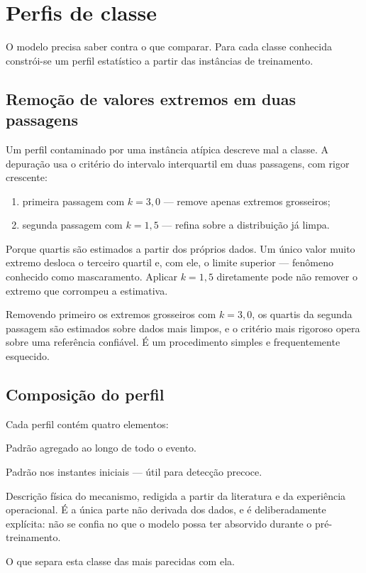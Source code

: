 \section{Perfis de classe}

O modelo precisa saber contra o que comparar. Para cada classe conhecida constrói-se um
perfil estatístico a partir das instâncias de treinamento.

\subsection{Remoção de valores extremos em duas passagens}

Um perfil contaminado por uma instância atípica descreve mal a classe. A depuração usa o
critério do intervalo interquartil em duas passagens, com rigor crescente:

\begin{enumerate}[leftmargin=*,itemsep=0.2em]
  \item primeira passagem com $k = 3{,}0$ --- remove apenas extremos grosseiros;
  \item segunda passagem com $k = 1{,}5$ --- refina sobre a distribuição já limpa.
\end{enumerate}

\begin{destaque}[Por que duas passagens e não uma com $k = 1{,}5$]
Porque quartis são estimados a partir dos próprios dados. Um único valor muito extremo
desloca o terceiro quartil e, com ele, o limite superior --- fenômeno conhecido como
mascaramento. Aplicar $k = 1{,}5$ diretamente pode não remover o extremo que corrompeu a
estimativa.

Removendo primeiro os extremos grosseiros com $k = 3{,}0$, os quartis da segunda
passagem são estimados sobre dados mais limpos, e o critério mais rigoroso opera sobre
uma referência confiável. É um procedimento simples e frequentemente esquecido.
\end{destaque}

\subsection{Composição do perfil}

Cada perfil contém quatro elementos:

\begin{description}[leftmargin=0pt,style=nextline,itemsep=0.4em]
\item[Comportamento macro.] Padrão agregado ao longo de todo o evento.
\item[Comportamento local.] Padrão nos instantes iniciais --- útil para detecção precoce.
\item[Conhecimento de domínio.] Descrição física do mecanismo, redigida a partir da
literatura e da experiência operacional. É a única parte não derivada dos dados, e é
deliberadamente explícita: não se confia no que o modelo possa ter absorvido durante o
pré-treinamento.
\item[Características distintivas.] O que separa esta classe das mais parecidas com ela.
\end{description}

